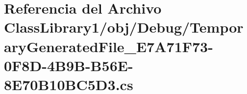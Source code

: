 \hypertarget{_class_library1_2obj_2_debug_2_temporary_generated_file___e7_a71_f73-0_f8_d-4_b9_b-_b56_e-8_e70_b10_b_c5_d3_8cs}{}\section{Referencia del Archivo Class\+Library1/obj/\+Debug/\+Temporary\+Generated\+File\+\_\+\+E7\+A71\+F73-\/0\+F8\+D-\/4\+B9\+B-\/\+B56\+E-\/8\+E70\+B10\+B\+C5\+D3.cs}
\label{_class_library1_2obj_2_debug_2_temporary_generated_file___e7_a71_f73-0_f8_d-4_b9_b-_b56_e-8_e70_b10_b_c5_d3_8cs}
